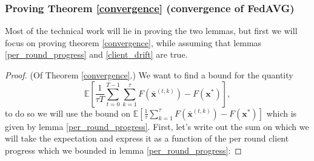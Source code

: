 \subsubsection*{Proving Theorem \ref{convergence} (convergence of FedAVG)}

Most of the technical work will lie in proving the two lemmas, but first we will focus on proving theorem \ref{convergence}, while assuming that lemmas \ref{per_round_progress} and \ref{client_drift} are true.

\begin{proof}
    (Of Theorem \ref{convergence}.) We want to find a bound for the quantity \[ \mathbb{E} \left[ \frac{1}{\tau T} \sum_{t=0}^{T-1}\sum_{k=1}^{\tau} F(\bar{\bm{x}}^{(t,k)}) - F(\bm{x}^*)\right], \]
    to do so we will use the bound on $\mathbb{E} \left[ \frac{1}{\tau} \sum_{k=1}^{\tau} F(\bar{\bm{x}}^{(t,k)}) - F(\bm{x}^*)\right]$ which is given by lemma \ref{per_round_progress}. First, let's write out the sum on which we will take the expectation and express it as a function of the per round client progress which we bounded in lemma \ref{per_round_progress}:


\end{proof}
